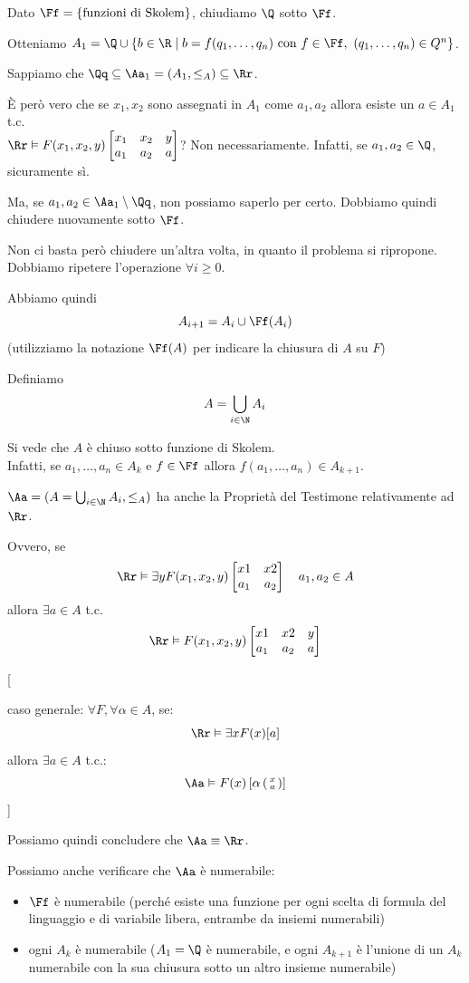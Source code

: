 \documentclass[a4paper,11pt]{report}
\newcommand{\ass}[2]{%
    \left( \begin{smallmatrix} #1 \\ #2 \end{smallmatrix} \right)
}
\begin{document}
Dato \( \Ff = \{ \text{funzioni di Skolem}\} \), chiudiamo \( \Q \) sotto \( \Ff \).

Otteniamo \( A_1 = \Q \cup \{b \in \R \mid b = f(q_1, \dots, q_n) \text{ con } f\in \Ff, \ (q_1, \dots, q_n) \in Q^n\} \).

Sappiamo che \( \Qq \subseteq \Aa_1 = (A_1, \leq_A) \subseteq \Rr\).

È però vero che se \( x_1, x_2 \) sono assegnati in \( A_1 \) come \( a_1, a_2 \) allora esiste un \( a \in A_1\) t.c. \\ \( \Rr \vDash F(x_1, x_2, y) \tworowmatrix{x_1 & x_2 & y}{a_1 & a_2 & a}  \)? Non necessariamente. Infatti, se \( a_1, a_2 \in \Q \), sicuramente sì. 

Ma, se \( a_1, a_2 \in \Aa_1 \setminus \Qq \), non possiamo saperlo per certo. Dobbiamo quindi chiudere nuovamente sotto \( \Ff \).

Non ci basta però chiudere un'altra volta, in quanto il problema si ripropone. Dobbiamo ripetere l'operazione \( \forall i \geq 0\).

Abbiamo quindi
\[ A_{i+1} = A_i \cup \Ff(A_i) \]
{\color{gray}(utilizziamo la notazione \( \Ff(A) \) per indicare la chiusura di \( A \) su \( F \))}

Definiamo 
\[ A = \bigcup_{i\in \N} A_i \]

Si vede che \( A \) è chiuso sotto funzione di Skolem. \\Infatti, se \( a_1, \dots, a_n \in A_k \) e \( f\in \Ff \) allora \( f(a_1, \dots, a_n) \in A_{k+1} \).

\( \Aa = ( A =\bigcup_{i\in \N} A_i, \leq_A) \) ha anche la Proprietà del Testimone relativamente ad \( \Rr \).

Ovvero, se 
\[ \Rr \vDash \exists y F(x_1, x_2, y)\tworowmatrix{x1 & x2}{a_1 & a_2} \quad a_1, a_2 \in A\]
allora \( \exists a \in A \) t.c.
\[ \Rr \vDash F(x_1, x_2, y)\tworowmatrix{x1 & x2 & y}{a_1 & a_2 & a} \]

{\color{CadetBlue}[

    caso generale: \( \forall F, \forall \alpha \in A \), se:
    \[ \Rr\vDash \exists x F(x)[a] \]
    allora \( \exists a \in A \) t.c.:
    \[ \Aa \vDash F(x)\left[\alpha \ass{x}{a}\right] \]
]}

Possiamo quindi concludere che \( \Aa \equiv \Rr \).

Possiamo anche verificare che \( \Aa \) è numerabile:
\begin{itemize}
    \item \( \Ff \) è numerabile (perché esiste una funzione per ogni scelta di formula del linguaggio e di variabile libera, entrambe da insiemi numerabili)
    \item ogni \( A_k \) è numerabile (\( A_1 = \Q \) è numerabile, e ogni \( A_{k+1} \) è l'unione di un \( A_k \) numerabile con la sua chiusura sotto un altro insieme numerabile)
\end{itemize}
\end{document}
